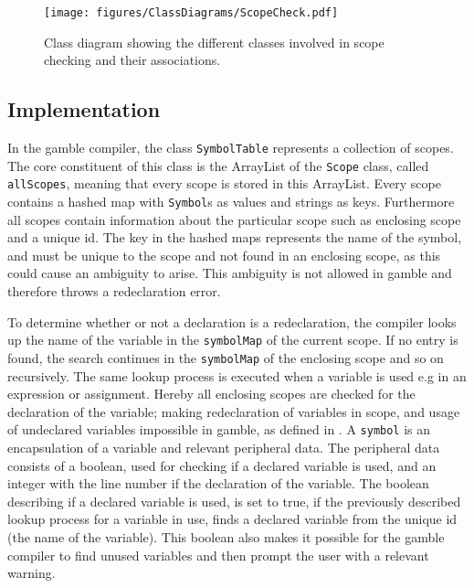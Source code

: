 \begin{figure}
\centering
\texttt{[image: figures/ClassDiagrams/ScopeCheck.pdf]}
\caption{Class diagram showing the different classes involved in scope checking and their associations.}
\label{fig:scopeCheck}
\end{figure}


\subsection*{Implementation}
In the \gls{gamble} compiler, the class \texttt{SymbolTable} represents a collection of scopes.
The core constituent of this class is the ArrayList of the \texttt{Scope} class, called \texttt{allScopes}, meaning that every scope is stored in this ArrayList.
Every scope contains a hashed map with \texttt{Symbol}s as values and strings as keys.
Furthermore all scopes contain information about the particular scope such as enclosing scope and a unique id. 
The key in the hashed maps represents the name of the symbol, and must be unique to the scope and not found in an enclosing scope, as this could cause an ambiguity to arise.
This ambiguity is not allowed in \gls{gamble} and therefore throws a redeclaration error.

To determine whether or not a declaration is a redeclaration, the compiler looks up the name of the variable in the \texttt{symbolMap} of the current scope.
If no entry is found, the search continues in the \texttt{symbolMap} of the enclosing scope and so on recursively.
The same lookup process is executed when a variable is used e.g in an expression or assignment.
Hereby all enclosing scopes are checked for the declaration of the variable; making redeclaration of variables in scope, and usage of undeclared variables impossible in \gls{gamble}, as defined in .
A \texttt{symbol} is an encapsulation of a variable and relevant peripheral data.
The peripheral data consists of a boolean, used for checking if a declared variable is used, and an integer with the line number if the declaration of the variable.
The boolean describing if a declared variable is used, is set to true, if the previously described lookup process for a variable in use, finds a declared variable from the unique id (the name of the variable).
This boolean also makes it possible for the \gls{gamble} compiler to find unused variables and then prompt the user with a relevant warning.


